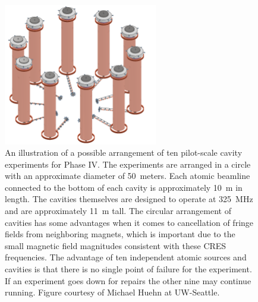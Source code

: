 \begin{figure}[htbp]
    \centering
    \includegraphics*[width=0.6\textwidth]{figs/Chapter-3/230718_PhaseIVPerspectiveView.png}
    \caption{\label{fig:chap3-p4-render}An illustration of a possible arrangement of ten pilot-scale cavity experiments for Phase IV. The experiments are arranged in a circle with an approximate diameter of 50~meters. Each atomic beamline connected to the bottom of each cavity is approximately 10~m in length. The cavities themselves are designed to operate at 325~MHz and are approximately 11~m tall. The circular arrangement of cavities has some advantages when it comes to cancellation of fringe fields from neighboring magnets, which is important due to the small magnetic field magnitudes consistent with these CRES frequencies. The advantage of ten independent atomic sources and cavities is that there is no single point of failure for the experiment. If an experiment goes down for repairs the other nine may continue running. Figure courtesy of Michael Huehn at UW-Seattle. }
\end{figure}